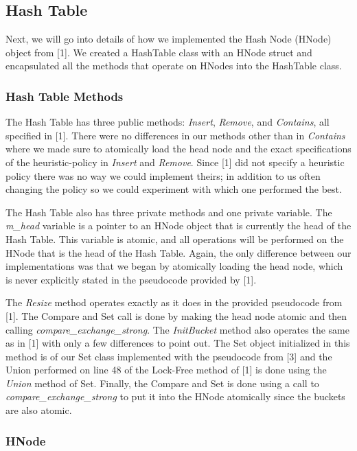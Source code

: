 \documentclass[11pt]{article} %
\begin{document}
\subsection{Hash Table}

Next, we will go into details of how we implemented the Hash Node (HNode) object from [1]. We created a HashTable class with an HNode struct and encapsulated all the methods that operate on HNodes into the HashTable class. 

\subsubsection{Hash Table Methods}

The Hash Table has three public methods: \textit{Insert}, \textit{Remove}, and \textit{Contains}, all specified in [1]. There were no differences in our methods other than in \textit{Contains} where we made sure to atomically load the head node and the exact specifications of the heuristic-policy in \textit{Insert} and \textit{Remove}. Since [1] did not specify a heuristic policy there was no way we could implement theirs; in addition to us often changing the policy so we could experiment with which one performed the best.

The Hash Table also has three private methods and one private variable. The \textit{m\_head} variable is a pointer to an HNode object that is currently the head of the Hash Table. This variable is atomic, and all operations will be performed on the HNode that is the head of the Hash Table. Again, the only difference between our implementations was that we began by atomically loading the head node, which is never explicitly stated in the pseudocode provided by [1].


The \textit{Resize} method operates exactly as it does in the provided pseudocode from [1]. The Compare and Set call is done by making the head node atomic and then calling \textit{compare\_exchange\_strong}. The \textit{InitBucket} method also operates the same as in [1] with only a few differences to point out. The Set object initialized in this method is of our Set class implemented with the pseudocode from [3] and the Union performed on line 48 of the Lock-Free method of [1] is done using the \textit{Union} method of Set. Finally, the Compare and Set is done using a call to \textit{compare\_exchange\_strong} to put it into the HNode atomically since the buckets are also atomic. 

\subsubsection{HNode}
\end{document}
